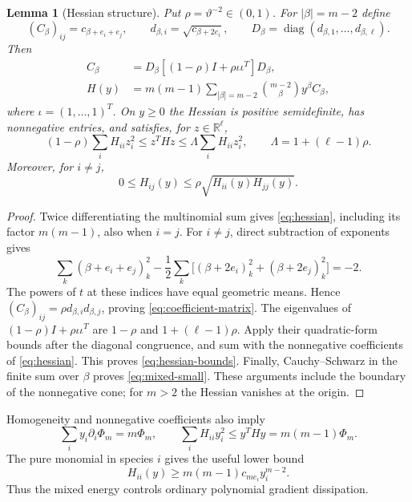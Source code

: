 \documentclass[11pt]{amsart}
\newtheorem{lemma}[theorem]{Lemma}
\theoremstyle{definition}
\newcommand{\R}{\mathbb R}
\numberwithin{equation}{section}
\begin{document}
\begin{lemma}[Hessian structure]\label{lem:hessian}
Put $\rho=\vartheta^{-2}\in(0,1)$. For $|\beta|=m-2$ define
\[
(C_\beta)_{ij}=c_{\beta+e_i+e_j},\qquad
d_{\beta,i}=\sqrt{c_{\beta+2e_i}},\qquad
D_\beta=\operatorname{diag}(d_{\beta,1},\ldots,d_{\beta,\ell}).
\]
Then
\begin{align}
C_\beta&=D_\beta[(1-\rho)I+\rho\iota\iota^T]D_\beta,
 \label{eq:coefficient-matrix}\\
H(y)&=m(m-1)\sum_{|\beta|=m-2}\binom{m-2}\beta y^\beta C_\beta,
 \label{eq:hessian}
\end{align}
where $\iota=(1,\ldots,1)^T$. On $y\geq0$ the Hessian is positive
semidefinite, has nonnegative entries, and satisfies, for $z\in\R^\ell$,
\begin{equation}\label{eq:hessian-bounds}
(1-\rho)\sum_iH_{ii}z_i^2
 \leq z^THz\leq\Lambda\sum_iH_{ii}z_i^2,
 \qquad \Lambda=1+(\ell-1)\rho.
\end{equation}
Moreover, for $i\ne j$,
\begin{equation}\label{eq:mixed-small}
0\leq H_{ij}(y)\leq\rho\sqrt{H_{ii}(y)H_{jj}(y)}.
\end{equation}
\end{lemma}
\begin{proof}
Twice differentiating the multinomial sum gives
\eqref{eq:hessian}, including its factor $m(m-1)$, also when $i=j$.
For $i\ne j$, direct subtraction of exponents gives
\[
\sum_k(\beta+e_i+e_j)_k^2
 -\frac12\sum_k\bigl[(\beta+2e_i)_k^2+(\beta+2e_j)_k^2\bigr]=-2.
\]
The powers of $t$ at these indices have equal geometric means. Hence
$(C_\beta)_{ij}=\rho d_{\beta,i}d_{\beta,j}$, proving
\eqref{eq:coefficient-matrix}. The eigenvalues of
$(1-\rho)I+\rho\iota\iota^T$ are $1-\rho$ and
$1+(\ell-1)\rho$. Apply their quadratic-form bounds after the diagonal
congruence, and sum with the nonnegative coefficients of
\eqref{eq:hessian}. This proves \eqref{eq:hessian-bounds}.
Finally, Cauchy--Schwarz in the finite sum over $\beta$ proves
\eqref{eq:mixed-small}. These arguments include the boundary of the
nonnegative cone; for $m>2$ the Hessian vanishes at the origin.
\end{proof}

Homogeneity and nonnegative coefficients also imply
\begin{equation}\label{eq:euler}
\sum_i y_i\partial_i\Phi_m=m\Phi_m,\qquad
\sum_iH_{ii}y_i^2\leq y^THy=m(m-1)\Phi_m.
\end{equation}
The pure monomial in species $i$ gives the useful lower bound
\begin{equation}\label{eq:diagonal-lower}
H_{ii}(y)\geq m(m-1)c_{me_i}y_i^{m-2}.
\end{equation}
Thus the mixed energy controls ordinary polynomial gradient dissipation.
\end{document}
